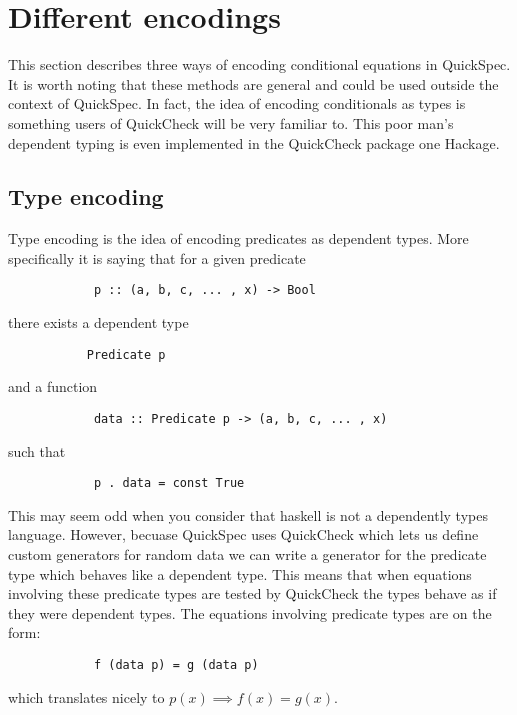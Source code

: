 \section{Different encodings}

    This section describes three
    ways of encoding conditional
    equations in QuickSpec. It is
    worth noting that these methods
    are general and could be used outside
    the context of QuickSpec. In fact,
    the idea of encoding conditionals
    as types is something users of
    QuickCheck %
    will be very familiar to. This poor
    man's dependent typing is even implemented
    in the QuickCheck package one Hackage.%

    \subsection{Type encoding}

        Type encoding is the idea of encoding
        predicates as dependent types. More specifically
        it is saying that for a given predicate
        \begin{verbatim}
            p :: (a, b, c, ... , x) -> Bool
        \end{verbatim}
        there exists a dependent type
        \begin{verbatim}
           Predicate p
        \end{verbatim}
        and a function 
        \begin{verbatim}
            data :: Predicate p -> (a, b, c, ... , x)
        \end{verbatim}
        such that 
        \begin{verbatim}
            p . data = const True
        \end{verbatim}
        This may seem odd when you consider that haskell is not a dependently types
        language. However, becuase QuickSpec uses QuickCheck which lets us define
        custom generators for random data we can write a generator for 
        the predicate type which behaves like a dependent type.
        This means that when equations involving these predicate
        types are tested by QuickCheck the types behave as if they were dependent types.
        The equations involving predicate types are on the form:
        \begin{verbatim}
            f (data p) = g (data p)
        \end{verbatim}
        which translates nicely to $p(x) \implies f(x) = g(x)$.

